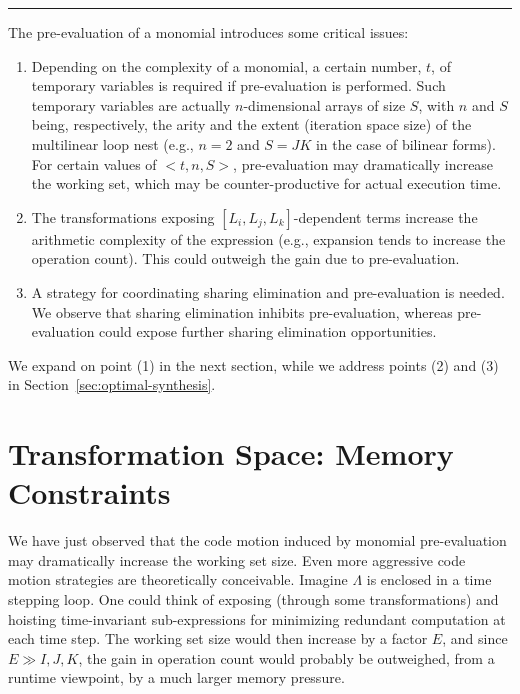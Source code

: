 
\noindent\rule[1.0ex]{\linewidth}{0.7pt}

The pre-evaluation of a monomial introduces some critical issues:
\begin{enumerate}
\item Depending on the complexity of a monomial, a certain number, $t$, of temporary variables is required if pre-evaluation is performed. Such temporary variables are actually $n$-dimensional arrays of size $S$, with $n$ and $S$ being, respectively, the arity and the extent (iteration space size) of the multilinear loop nest (e.g., $n=2$ and $S = J K$ in the case of bilinear forms). For certain values of ${<}t, n, S{>}$, pre-evaluation may dramatically increase the working set, which may be counter-productive for actual execution time.
\item The transformations exposing $[L_i, L_j, L_k]$-dependent terms increase the arithmetic complexity of the expression (e.g., expansion tends to increase the operation count). This could outweigh the gain due to pre-evaluation.
\item A strategy for coordinating sharing elimination and pre-evaluation is needed. We observe that sharing elimination inhibits pre-evaluation, whereas pre-evaluation could expose further sharing elimination opportunities.
\end{enumerate}

We expand on point (1) in the next section, while we address points (2) and (3) in Section~\ref{sec:optimal-synthesis}. 

\section{Transformation Space: Memory Constraints}
\label{sec:mem-const}
We have just observed that the code motion induced by monomial pre-evaluation may dramatically increase the working set size. Even more aggressive code motion strategies are theoretically conceivable. Imagine $\Lambda$ is enclosed in a time stepping loop. One could think of exposing (through some transformations) and hoisting time-invariant sub-expressions for minimizing redundant computation at each time step. The working set size would then increase by a factor $E$, and since $E \gg I, J, K$, the gain in operation count would probably be outweighed, from a runtime viewpoint, by a much larger memory pressure.

